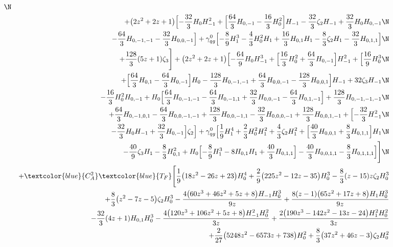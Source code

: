 \begin{eqnarray}
\N\\&&
+\big(2 z^2+2 z+1\big) \Bigl[
-\frac{32}{3} H_0 H_{-1}^2+\Bigl[
\frac{64}{3} H_{0,-1}
-\frac{16}{3} H_0^2\Bigr] H_{-1}
-\frac{32}{3} \zeta_2 H_{-1}
+\frac{32}{3} H_0 H_{0,-1}
\N\\&&
-\frac{64}{3} H_{0,-1,-1}
-\frac{32}{3} H_{0,0,-1}\Bigr]
+{\gamma}_{qg}^{0} \Bigl[
-\frac{8}{9} H_1^3
-\frac{4}{3} H_0^2 H_1
+\frac{16}{3} H_{0,1} H_1
-\frac{8}{3} \zeta_2 H_1
-\frac{32}{3} H_{0,1,1}\Bigr]
\N\\&&
+\frac{128}{3} (5 z+1) \zeta_3\Biggr]
+\big(2 z^2+2 z+1\big) \Bigl[
-\frac{64}{9} H_0 H_{-1}^3+\Bigl[
\frac{16}{3} H_0^2
+\frac{64}{3} H_{0,-1}\Bigr] H_{-1}^2+\Bigl[
\frac{16}{9} H_0^3
\N\\&&
+\Bigl[
\frac{64}{3} H_{0,1}
-\frac{64}{3} H_{0,-1}\Bigr] H_0
-\frac{128}{3} H_{0,-1,-1}
+\frac{64}{3} H_{0,0,-1}
-\frac{128}{3} H_{0,0,1}\Bigr] H_{-1}+32 \zeta_3 H_{-1}
\N\\&&
-\frac{16}{3} H_0^2 H_{0,-1}+H_0 \Bigl[
\frac{64}{3} H_{0,-1,-1}
-\frac{64}{3} H_{0,-1,1}
+\frac{32}{3} H_{0,0,-1}
-\frac{64}{3} H_{0,1,-1}\Bigr]
+\frac{128}{3} H_{0,-1,-1,-1}
\N\\&&
+\frac{64}{3} H_{0,-1,0,1}
-\frac{64}{3} H_{0,0,-1,-1}
+\frac{128}{3} H_{0,0,-1,1}
-\frac{32}{3} H_{0,0,0,-1}
+\frac{128}{3} H_{0,0,1,-1}+\Bigl[
-\frac{32}{3} H_{-1}^2
\N\\&&
-\frac{32}{3} H_0 H_{-1}
+\frac{32}{3} H_{0,-1}\Bigr] \zeta_2\Bigr]
+{\gamma}_{qg}^{0} \Bigl[
\frac{1}{9} H_1^4
+\frac{2}{3} H_0^2 H_1^2
+\frac{4}{3} \zeta_2 H_1^2+\Bigl[
\frac{40}{3} H_{0,0,1}
+\frac{8}{3} H_{0,1,1}\Bigr] H_1
\N\\&&
-\frac{40}{9} \zeta_3 H_1
-\frac{8}{3} H_{0,1}^2
+H_0 \Bigl[
-\frac{8}{9} H_1^3-8 H_{0,1} H_1
+\frac{40}{3} H_{0,1,1}\Bigr]
-\frac{40}{3} H_{0,0,1,1}
-\frac{8}{3} H_{0,1,1,1}\Bigr]\Biggr]
\N\\&&
%
+\textcolor{blue}{C_A^2}  \textcolor{blue}{T_F}
\Biggl[\frac{1}{9} \big(18 z^2-26z+23\big) H_0^4+\frac{2}{9} \big(225 z^2-12 z-35\big) H_0^3-\frac{8}{3} (z-15) z \zeta_2 H_0^3
\nonumber \\ &&
+\frac{8}{3} \big(z^2-7 z-5\big) \zeta_2H_0^3-\frac{4 \big(60 z^3+46 z^2+5 z+8\big) H_{-1} H_0^3}{9 z}+\frac{8 (z-1)  \big(65 z^2+17 z+8\big) H_1 H_0^3}{9 z}
\nonumber \\ &&
-\frac{32}{3} (4 z+1) H_{0,1}H_0^3-\frac{4 \big(120 z^3+106 z^2+5 z+8\big) H_{-1}^2 H_0^2}{3 z}
+\frac{2  \big(190 z^3-142 z^2-13 z-24\big) H_1^2 H_0^2}{3 z}
\nonumber \\ &&
+\frac{2}{27} \big(5248z^2-6573 z+738\big) H_0^2+\frac{8}{3}  \big(37 z^2+46 z-3\big)\zeta_2 H_0^2

\end{eqnarray}
